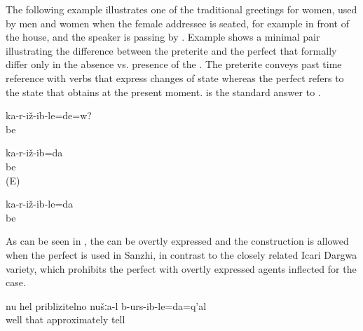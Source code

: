The following example illustrates one of the traditional greetings for women, used by men and women when the female addressee is seated, for example in front of the house, and the speaker is passing by . Example  shows a minimal pair illustrating the difference between the preterite and the perfect that formally differ only in the absence vs. presence of the . The preterite conveys past time reference with verbs that express changes of state whereas the perfect refers to the state that obtains at the present moment.  is the standard answer to .
%
\begin{exe}
	\ex	\label{ex:Are you sitting (seated) analytic}
	\gll	ka-r-iž-ib-le=de=w?\\
		be\\
	\glt	{}

	\ex	\label{ex:I am sitting sat down analytic}
	\begin{xlist}
		\ex	\label{ex:I sat down analytic}
		\gll	ka-r-iž-ib=da\\
			be\\
		\glt	{} (E)

		\ex	\label{ex:I am sitting analytic}
		\gll	ka-r-iž-ib-le=da\\
			be\\
		\glt	{}
	\end{xlist}
\end{exe}

As can be seen in , the  can be overtly expressed and the  construction is allowed when the perfect is used in Sanzhi, in contrast to the closely related Icari Dargwa variety, which prohibits the perfect with overtly expressed agents inflected for the  case.
%
\begin{exe}
	\ex	\label{ex:Well, approximately we already said it analytic}
	\gll	nu	hel	priblizitelno	nušːa-l	b-urs-ib-le=da=q'al\\
		well	that	approximately		tell\\
	\glt	{}
	\end{exe}
	
